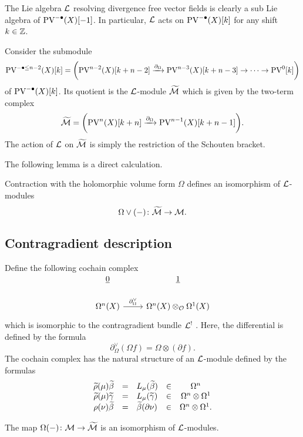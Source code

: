 \documentclass[11pt]{amsart}
\def\PV{{\rm PV}}
\begin{document}
The Lie algebra $\cL$ resolving divergence free vector fields is clearly a sub Lie algebra of $\PV^{-\bu} (X) [-1]$. 
In particular, $\cL$ acts on $\PV^{-\bu} (X) [k]$ for any shift $k \in \ZZ$. 

Consider the submodule 
\[
\PV^{- \bu\leq n-2} (X) [k] = \bigg(\PV^{n-2}(X) [k+n-2] \xto{\partial_\Omega} \PV^{n-3}(X) [k+n-3] \to \cdots \to \PV^{0} [k] \bigg) 
\]
of $\PV^{-\bu}(X)[k]$. 
Its quotient is the $\cL$-module $\Tilde{\cM}$ which is given by the two-term complex
\[
\Tilde{\cM} = \bigg(\PV^{n}(X) [k+n] \xto{\partial_\Omega}  \PV^{n-1}(X) [k+n-1] \bigg) .
\]
The action of $\cL$ on $\Tilde{\cM}$ is simply the restriction of the Schouten bracket. 

The following lemma is a direct calculation.

\begin{lem}
Contraction with the holomorphic volume form $\Omega$ defines an isomorphism of $\cL$-modules
\[
\Omega \vee (-) \colon \Tilde{\cM} \to \cM .
\] 
\end{lem}

\subsection{Contragradient description} 

Define the following cochain complex
\[
\begin{tikzcd}
\ul{0} & \ul{1} \\
\Omega^{n} (X) \ar[r, "\partial^\vee_\Omega"] & \Omega^{n}(X) \otimes_{\cO} \Omega^1 (X) 
\end{tikzcd}
\]
which is isomorphic to the contragradient bundle $\cL^!$ . 
Here, the differential is defined by the formula
\[
\partial^\vee_\Omega (\Omega f) = \Omega \otimes (\partial f) .
\]
The cochain complex has the natural structure of an $\cL$-module defined by the formulas
\[
\begin{array}{cclcc}
\Tilde{\rho}(\mu) \Tilde{\beta} & = & L_\mu(\Tilde{\beta}) & \in &\Omega^n \\
\Tilde{\rho} (\mu) \Tilde{\gamma} & = & L_\mu (\Tilde{\gamma}) & \in &\Omega^n \otimes \Omega^1 \\ 
\rho(\nu) \Tilde{\beta} & = & \Tilde{\beta} (\partial \nu)  & \in & \Omega^n \otimes \Omega^1 .
\end{array}
\]

\begin{lem}
The map $\Omega (-) \colon \cM \to \Tilde{\cM}$ is an isomorphism of $\cL$-modules.
\end{lem}
\end{document}
